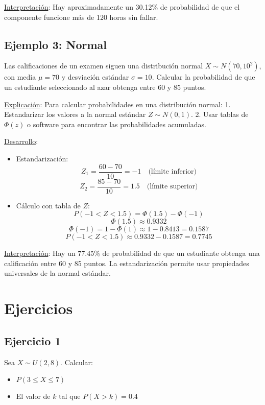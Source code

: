 \documentclass[letterpaper]{article}
\begin{document}
	\underline{Interpretación}: Hay aproximadamente un 30.12\% de probabilidad de que el componente funcione más de 120 horas sin fallar.
	
	\subsection{Ejemplo 3: Normal}
	Las calificaciones de un examen siguen una distribución normal $X \sim N(70, 10^2)$, con media $\mu = 70$ y desviación estándar $\sigma = 10$. Calcular la probabilidad de que un estudiante seleccionado al azar obtenga entre 60 y 85 puntos.
	
	\underline{Explicación}:
	Para calcular probabilidades en una distribución normal:
	1. Estandarizar los valores a la normal estándar $Z \sim N(0, 1)$.
	2. Usar tablas de $\Phi(z)$ o software para encontrar las probabilidades acumuladas.
	
	\underline{Desarrollo}:
	\begin{itemize}
		\item Estandarización:
		\[ Z_1 = \frac{60 - 70}{10} = -1 \quad \text{(límite inferior)} \]
		\[ Z_2 = \frac{85 - 70}{10} = 1.5 \quad \text{(límite superior)} \]
		
		\item Cálculo con tabla de $Z$:
		\[ P(-1 < Z < 1.5) = \Phi(1.5) - \Phi(-1) \]
		\[ \Phi(1.5) \approx 0.9332 \]
		\[ \Phi(-1) = 1 - \Phi(1) \approx 1 - 0.8413 = 0.1587 \]
		\[ P(-1 < Z < 1.5) \approx 0.9332 - 0.1587 = 0.7745 \]
	\end{itemize}
	
	\underline{Interpretación}: Hay un 77.45\% de probabilidad de que un estudiante obtenga una calificación entre 60 y 85 puntos. La estandarización permite usar propiedades universales de la normal estándar.
	
	\section{Ejercicios}
	
	\subsection{Ejercicio 1}
	Sea $X \sim U(2, 8)$. Calcular:
	\begin{itemize}
		\item $P(3 \leq X \leq 7)$
		\item El valor de $k$ tal que $P(X > k) = 0.4$
	\end{itemize}
	
\end{document}
